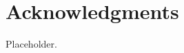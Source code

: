 
\begin{abstract}
Placeholder abstract.
\end{abstract}

\chapter*{Acknowledgments}
Placeholder.

\tableofcontents
